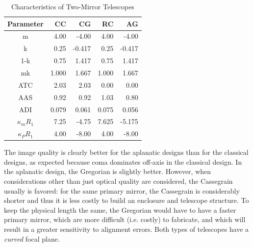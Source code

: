 \documentclass[12pt]{article}
\begin{document}
\begin{table}[h]
\centering
\begin{tabular}{c r r r r}
Parameter & CC & CG & RC & AG\\
\hline\hline
m & 4.00 & -4.00 & 4.00 & -4.00\\
k & 0.25 & -0.417 & 0.25 & -0.417\\
1-k & 0.75 & 1.417 & 0.75 & 1.417\\
mk & 1.000 & 1.667 & 1.000 & 1.667\\
ATC & 2.03 & 2.03 & 0.00 & 0.00\\
AAS & 0.92 & 0.92 & 1.03 & 0.80\\
ADI & 0.079 & 0.061 & 0.075 & 0.056\\
$\kappa_{m}R_{1}$ & 7.25 & -4.75 & 7.625 & -5.175\\
$\kappa_{P}R_{1}$ & 4.00 & -8.00 & 4.00 & -8.00\\
\hline
\end{tabular}
\caption{Characteristics of Two-Mirror Telescopes}
\end{table}

The image quality is clearly better for the aplanatic designs than for
the classical designs, as expected because coma dominates off-axis in
the classical design. In the aplanatic design, the Gregorian is
slightly better. However, when considerations other than just optical
quality are considered, the Cassegrain usually is favored: for the
same primary mirror, the Cassegrain is considerably shorter and thus
it is less costly to build an enclosure and telescope structure. To
keep the physical length the same, the Gregorian would have to have a
faster primary mirror, which are more difficult (i.e. costly) to
fabricate, and which will result in a greater sensitivity to alignment
errors. Both types of telescopes have a \emph{curved} focal plane.
\end{document}
